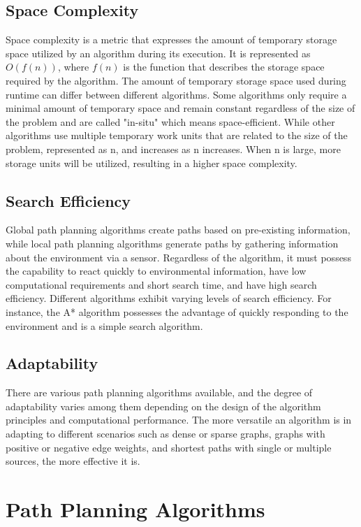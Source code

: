 \documentclass[bibliography=totoc]{scrartcl}
\begin{document}
\subsection{Space Complexity}
Space complexity is a metric that expresses the amount of temporary storage space utilized by an algorithm during its execution. 
It is represented as $O(f(n))$, where $f(n)$ is the function that describes the storage space required by the algorithm. 
The amount of temporary storage space used during runtime can differ between different algorithms. 
Some algorithms only require a minimal amount of temporary space and remain constant regardless of the size of the problem and are called "in-situ" which means space-efficient. 
While other algorithms use multiple temporary work units that are related to the size of the problem, represented as n, and increases as n increases. 
When n is large, more storage units will be utilized, resulting in a higher space complexity.

\subsection{Search Efficiency}

Global path planning algorithms create paths based on pre-existing information, while local path planning algorithms generate paths by gathering information about the environment via a sensor. 
Regardless of the algorithm, it must possess the capability to react quickly to environmental information, have low computational requirements and short search time, and have high search efficiency. Different algorithms exhibit varying levels of search efficiency. 
For instance, the A* algorithm possesses the advantage of quickly responding to the environment and is a simple search algorithm.

\subsection{Adaptability}
There are various path planning algorithms available, and the degree of adaptability varies among them depending on the design of the algorithm principles and computational performance. 
The more versatile an algorithm is in adapting to different scenarios such as dense or sparse graphs, graphs with positive or negative edge weights, and shortest paths with single or multiple sources, the more effective it is. 

\section{Path Planning Algorithms}
\label{path_planning_algorithm}
\end{document}
